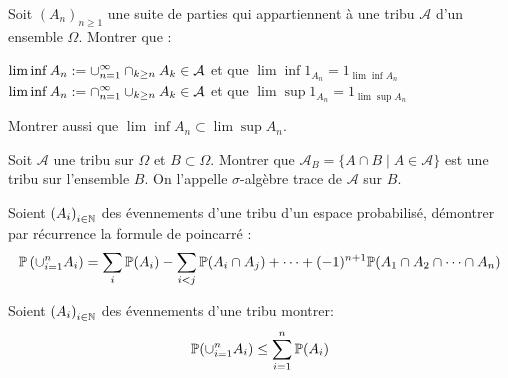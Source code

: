 \documentclass{report}
\begin{document}
\begin{exo}
    Soit \(\left(A_n\right)_{n\geq1}\) une suite de parties qui appartiennent
    à une tribu \(\mathcal{A}\) d'un ensemble \(\Omega\). Montrer que :
    \begin{enumerate}
        \itt \(\displaystyle \lim\inf A_n := \cup_{n=1}^\infty\cap_{k\geq n} A_k \in \mathcal{A}\)
        et que \(\lim\inf 1_{A_n} = 1_{\lim\inf A_n}\)
        \itt \(\displaystyle \lim\inf A_n := \cap_{n=1}^\infty\cup_{k\geq n} A_k \in \mathcal{A}\)
        et que \(\lim\sup 1_{A_n} = 1_{\lim\sup A_n}\)
    \end{enumerate}
    Montrer aussi que \(\lim\inf A_n\subset\lim\sup A_n\).
\end{exo}

\begin{exo}
    Soit \(\mathcal{A}\) une tribu sur \(\Omega\) et \(B\subset\Omega\). Montrer que
    \(\mathcal{A}_B=\{A\cap B\mid A\in\mathcal{A}\}\) est une tribu sur
    l'ensemble \(B\). On l'appelle \(\sigma\)-algèbre trace de \(\mathcal{A}\) sur \(B\).
\end{exo}

\begin{exo}
    Soient \(\left(A_i\right)_{i\in\mathbb{N}}\) des évennements d'une tribu d'un espace
    probabilisé, démontrer par récurrence la formule de poincarré :
    \[\mathbb{P}\left(\cup_{i=1}^nA_i\right)=\sum_i\mathbb{P}(A_i)-\sum_{i<j}\mathbb{P}(A_i\cap A_j)
    + \dots + (-1)^{n+1}\mathbb{P}(A_1\cap A_2 \cap\dots\cap A_n)\]
\end{exo}

\begin{exo}
    Soient \(\left(A_i\right)_{i\in\mathbb{N}}\) des évennements d'une tribu montrer:
    \[ \mathbb{P}(\cup_{i=1}^nA_i)\leq \sum_{i=1}^n\mathbb{P}(A_i)\]
\end{exo}
\end{document}
